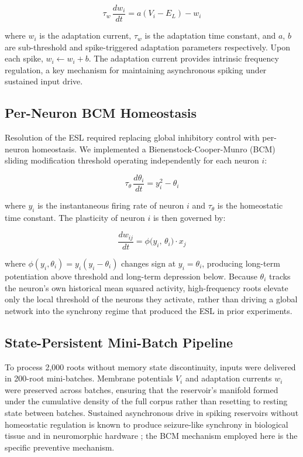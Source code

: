 \documentclass{article}
\begin{document}
\begin{equation}
  \tau_w\,\frac{dw_i}{dt} = a(V_i - E_L) - w_i
  \label{eq:adex_adapt}
\end{equation}

where $w_i$ is the adaptation current, $\tau_w$ is the adaptation time constant, and
$a$, $b$ are sub-threshold and spike-triggered adaptation parameters respectively. Upon
each spike, $w_i \leftarrow w_i + b$. The adaptation current provides intrinsic
frequency regulation, a key mechanism for maintaining asynchronous spiking under
sustained input drive.

\subsection{Per-Neuron BCM Homeostasis}

Resolution of the ESL required replacing global inhibitory control with
per-neuron homeostasis. We implemented a Bienenstock-Cooper-Munro (BCM) sliding
modification threshold \citep{bienenstock1982,bienenstock1982bcm,intrator1992,bear1987,oja1982} operating independently for each
neuron $i$:

\begin{equation}
  \tau_\theta\,\frac{d\theta_i}{dt} = y_i^2 - \theta_i
  \label{eq:bcm}
\end{equation}

where $y_i$ is the instantaneous firing rate of neuron $i$ and $\tau_\theta$ is the
homeostatic time constant. The plasticity of neuron $i$ is then governed by:

\begin{equation}
  \frac{dw_{ij}}{dt} = \phi\bigl(y_i,\,\theta_i\bigr) \cdot x_j
  \label{eq:bcm2}
\end{equation}

where $\phi(y_i, \theta_i) = y_i(y_i - \theta_i)$ changes sign at $y_i = \theta_i$,
producing long-term potentiation above threshold and long-term depression below. Because
$\theta_i$ tracks the neuron's own historical mean squared activity, high-frequency
roots elevate only the local threshold of the neurons they activate, rather than driving
a global network into the synchrony regime that produced the ESL in prior experiments.

\subsection{State-Persistent Mini-Batch Pipeline}

To process 2,000 roots without memory state discontinuity, inputs were delivered in
200-root mini-batches. Membrane potentials $V_i$ and adaptation currents $w_i$ were
preserved across batches, ensuring that the reservoir's manifold formed under the
cumulative density of the full corpus rather than resetting to resting state between
batches. Sustained asynchronous drive in spiking reservoirs without homeostatic regulation
is known to produce seizure-like synchrony in biological tissue \citep{jiruska2013} and
in neuromorphic hardware \citep{furber2014}; the BCM mechanism employed here is the
specific preventive mechanism.
\end{document}
